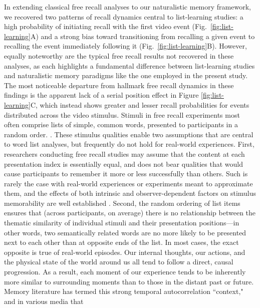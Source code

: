 \documentclass{article}
\begin{document}

In extending classical free recall analyses to our naturalistic memory framework, we recovered two patterns of recall dynamics central to list-learning studies: a high probability of initiating recall with the first video event (Fig.~\ref{fig:list-learning}A) and a strong bias toward transitioning from recalling a given event to recalling the event immediately following it (Fig.~\ref{fig:list-learning}B).  However, equally noteworthy are the typical free recall results not recovered in these analyses, as each highlights a fundamental difference between list-learning studies and naturalistic memory paradigms like the one employed in the present study.  The most noticeable departure from hallmark free recall dynamics in these findings is the apparent lack of a serial position effect in Figure \ref{fig:list-learning}C, which instead shows greater and lesser recall probabilities for events distributed across the video stimulus.  Stimuli in free recall experiments most often comprise lists of simple, common words, presented to participants in a random order. \citep[In fact, numerous word pools have been developed based on these criteria; e.g.,][]{FrieEtal82}.  These stimulus qualities enable two assumptions that are central to word list analyses, but frequently do not hold for real-world experiences.  First, researchers conducting free recall studies may assume that the content at each presentation index is essentially equal, and does not bear qualities that would cause participants to remember it more or less successfully than others.  Such is rarely the case with real-world experiences or experiments meant to approximate them, and the effects of both intrinsic and observer-dependent factors on stimulus memorability are well established \citep[for review see][]{ChunTurk07, ByliEtal15, TyngEtal17}.  Second, the random ordering of list items ensures that (across participants, on average) there is no relationship between the thematic similarity of individual stimuli and their presentation positions---in other words, two semantically related words are no more likely to be presented next to each other than at opposite ends of the list.  In most cases, the exact opposite is true of real-world episodes.  Our internal thoughts, our actions, and the physical state of the world around us all tend to follow a direct, causal progression.  As a result, each moment of our experience tends to be inherently more similar to surrounding moments than to those in the distant past or future.  Memory literature has termed this strong temporal autocorrelation ``context," and in various media that 
\end{document}
